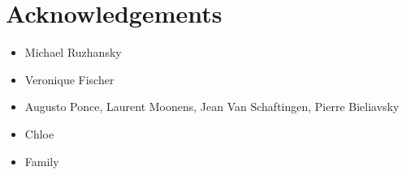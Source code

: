 \chapter*{Acknowledgements}

\begin{itemize}
    \item Michael Ruzhansky
    \item Veronique Fischer
    \item Augusto Ponce, Laurent Moonens, Jean Van Schaftingen, Pierre Bieliavsky
    \item Chloe
    \item Family
\end{itemize}
